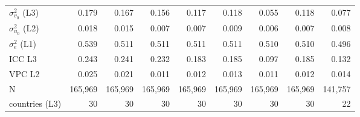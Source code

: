 \begin{table}
{\begin{tabular}{lrrrrrrrr}
$\sigma^2_{v_0}$ (L3) & 0.179 & 0.167 & 0.156 & 0.117 & 0.118 & 0.055 & 0.118 & 0.077 \\
$\sigma^2_{u_0}$ (L2) & 0.018 & 0.015 & 0.007 & 0.007 & 0.009 & 0.006 & 0.007 & 0.008 \\
$\sigma^2_e$  (L1) & 0.539 & 0.511 & 0.511 & 0.511 & 0.511 & 0.510 & 0.510 & 0.496 \\
ICC L3 & 0.243 & 0.241 & 0.232 & 0.183 & 0.185 & 0.097 & 0.185 & 0.132 \\
VPC L2 & 0.025 & 0.021 & 0.011 & 0.012 & 0.013 & 0.011 & 0.012 & 0.014 \\
N & 165,969 & 165,969 & 165,969 & 165,969 & 165,969 & 165,969 & 165,969 & 141,757 \\
countries (L3) & 30 & 30 & 30 & 30 & 30 & 30 & 30 & 22 \\
\bottomrule
\end{tabular}
}%
\end{table}
